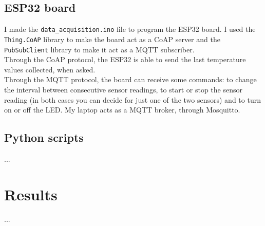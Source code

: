 \documentclass[conference]{IEEEtran}
\begin{document}
\subsection{ESP32 board}
I made the \texttt{data\_acquisition.ino} file to program the ESP32 board. I used the \texttt{Thing.CoAP} library to make the board act as a CoAP server and the \texttt{PubSubClient} library to make it act as a MQTT subscriber.\\
Through the CoAP protocol, the ESP32 is able to send the last temperature values collected, when asked.\\
Through the MQTT protocol, the board can receive some commands: to change the interval between consecutive sensor readings, to start or stop the sensor reading (in both cases you can decide for just one of the two sensors) and to turn on or off the LED. My laptop acts as a MQTT broker, through Mosquitto.

\subsection{Python scripts}
...


\section{Results}
...

\end{document}
